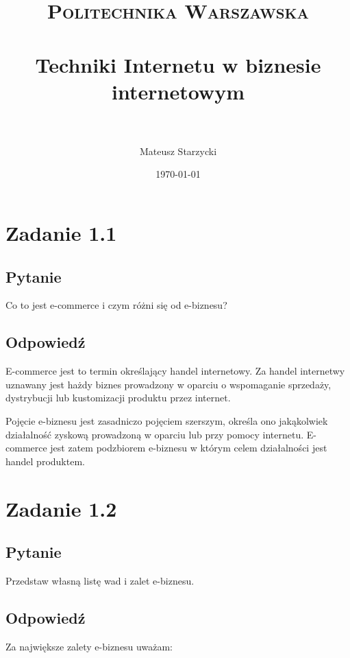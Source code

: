 \documentclass[paper=a4, fontsize=11pt]{scrartcl} %
\title{ 
    \normalfont \normalsize 
    \textsc{Politechnika Warszawska} \\ [25pt] %
    \horrule{0.5pt} \\[0.4cm] %
    \huge Techniki Internetu w biznesie internetowym\\ %
    \horrule{2pt} \\[0.5cm] %
}
\author{Mateusz Starzycki} %
\date{\normalsize\today} %
\numberwithin{equation}{section} %
\numberwithin{figure}{section} %
\numberwithin{table}{section} %
\begin{document}
\maketitle %


\newpage

\section{Zadanie 1.1}

\subsection {Pytanie}

Co to jest e-commerce i czym różni się od e-biznesu?

\subsection  {Odpowiedź}

E-commerce jest to termin określający handel internetowy.
Za handel internetwy uznawany jest hażdy biznes prowadzony w oparciu o
wspomaganie sprzedaży, dystrybucji lub kustomizacji produktu przez internet.

Pojęcie e-biznesu jest zasadniczo pojęciem szerszym, określa ono jakąkolwiek działalność
zyskową prowadzoną w oparciu lub przy pomocy internetu. E-commerce jest zatem podzbiorem
e-biznesu w którym celem działalności jest handel produktem.

\section{Zadanie 1.2}

\subsection {Pytanie}

Przedstaw własną listę wad i zalet e-biznesu.

\subsection {Odpowiedź}

Za największe zalety e-biznesu uważam:
\end{document}
